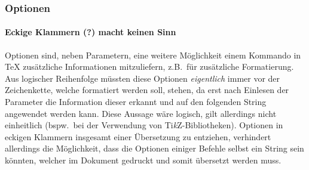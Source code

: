 
\subsubsection{Optionen}\par
\paragraph*{Eckige Klammern (?) macht keinen Sinn}\par
Optionen sind, neben Parametern, eine weitere Möglichkeit einem Kommando in \TeX{} zusätzliche Informationen mitzuliefern, z.B.\ für zusätzliche Formatierung. Aus logischer Reihenfolge müssten diese Optionen \textit{eigentlich} immer vor der Zeichenkette, welche formatiert werden soll, stehen, da erst nach Einlesen der Parameter die Information dieser erkannt und auf den folgenden String angewendet werden kann.%
Diese Aussage wäre logisch, gilt allerdings nicht einheitlich (bspw.\ bei der Verwendung von Ti\textit{k}Z-Bibliotheken). Optionen in eckigen Klammern insgesamt einer Übersetzung zu entziehen, verhindert allerdings die Möglichkeit, dass die Optionen einiger Befehle selbst ein String sein könnten, welcher im Dokument gedruckt und somit übersetzt werden muss.
\begin{comment}
\subparagraph*{Beispiele:}\par
\subparagraph*{Muster:}\par
Die hier anfallenden Fehler äußern sich in sechs Permutationen, in welchen immer nur ein String (\texttt{translatable}) übersetzt werden darf und ein weiterer String  (\texttt{non-translatable}) nicht.
Sie zeigen sich in 
\verb|\command[non-translatable] translatable|, \pdfcomment{bspw.\ \marginpar[translatable] text, benötigt logischerweise den Platz dafür}  
\verb|\command[translatable] translatable| \pdfcomment{bspw.\ \item[translatable] text} 
\verb|\command[non-translatable]{non-translatable}|, 
\verb|\command[non-translatable]{translatable}|, 
\verb|\command[translatable]{non-translatable}|, oder
\verb|\command[translatable]{translatable}|
und sind anhand spezifischer Kommandos erkennbar.
\end{comment}


